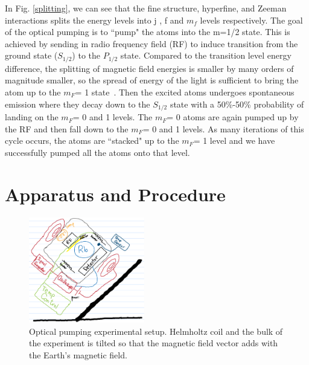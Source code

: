 \documentclass{sigchi}
\begin{document}
In Fig. \ref{splitting}, we can see that the fine structure, hyperfine, and Zeeman interactions splits the energy levels into j , f and $m_f$ levels respectively. The goal of the optical pumping is to ``pump" the atoms into the m=1/2 state. This is achieved by sending in radio frequency field (RF) to induce transition from the ground state ($S_{1/2}$) to the $P_{1/2}$ state. Compared to the transition level energy difference, the splitting of magnetic field energies is smaller by many orders of magnitude smaller, so the spread of energy of the light is sufficient to bring the atom up to the $m_F $= 1 state~\cite{Paschotta}.  Then the excited atoms undergoes spontaneous emission where they decay down to the $S_{1/2}$ state with a 50\%-50\%  probability of landing on the $m_F $= 0 and 1 levels. The  $m_F $= 0 atoms are again pumped up by the RF and then fall down to the  $m_F $= 0 and 1 levels. As many iterations of this cycle occurs, the atoms are ``stacked" up to the  $m_F $= 1 level and we have successfully pumped all the atoms onto that level.
\section{Apparatus and Procedure}\label{sec:ap}
\begin{figure}[h]
\includegraphics[width=0.45\textwidth]{plots/setup.png}
\caption{Optical pumping experimental setup. Helmholtz coil and the bulk of the experiment is tilted so that the magnetic field vector adds with the Earth's magnetic field.}
\label{setup}
\end{figure}
\end{document}

